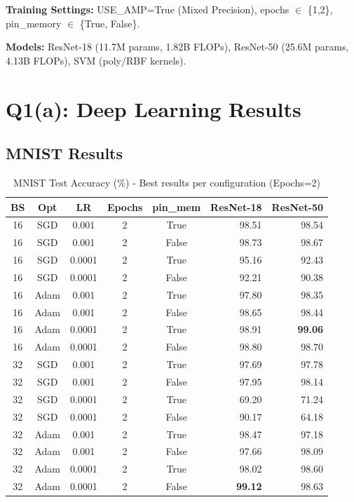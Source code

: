 \documentclass[conference]{IEEEtran}
\begin{document}
\textbf{Training Settings:} USE\_AMP=True (Mixed Precision), epochs $\in$ \{1,2\}, pin\_memory $\in$ \{True, False\}.

\textbf{Models:} ResNet-18 (11.7M params, 1.82B FLOPs), ResNet-50 (25.6M params, 4.13B FLOPs), SVM (poly/RBF kernels).

\section{Q1(a): Deep Learning Results}

\subsection{MNIST Results}
\begin{table}[h]
\centering
\caption{MNIST Test Accuracy (\%) - Best results per configuration (Epochs=2)}
\label{tab:mnist}
\begin{tabular}{cccccrr}
\toprule
BS & Opt & LR & Epochs & pin\_mem & ResNet-18 & ResNet-50 \\
\midrule
16 & SGD & 0.001 & 2 & True & 98.51 & 98.54 \\
16 & SGD & 0.001 & 2 & False & 98.73 & 98.67 \\
16 & SGD & 0.0001 & 2 & True & 95.16 & 92.43 \\
16 & SGD & 0.0001 & 2 & False & 92.21 & 90.38 \\
16 & Adam & 0.001 & 2 & True & 97.80 & 98.35 \\
16 & Adam & 0.001 & 2 & False & 98.65 & 98.44 \\
16 & Adam & 0.0001 & 2 & True & 98.91 & \textbf{99.06} \\
16 & Adam & 0.0001 & 2 & False & 98.80 & 98.70 \\
32 & SGD & 0.001 & 2 & True & 97.69 & 97.78 \\
32 & SGD & 0.001 & 2 & False & 97.95 & 98.14 \\
32 & SGD & 0.0001 & 2 & True & 69.20 & 71.24 \\
32 & SGD & 0.0001 & 2 & False & 90.17 & 64.18 \\
32 & Adam & 0.001 & 2 & True & 98.47 & 97.18 \\
32 & Adam & 0.001 & 2 & False & 97.66 & 98.09 \\
32 & Adam & 0.0001 & 2 & True & 98.02 & 98.60 \\
32 & Adam & 0.0001 & 2 & False & \textbf{99.12} & 98.63 \\
\bottomrule
\end{tabular}
\end{table}
\end{document}
